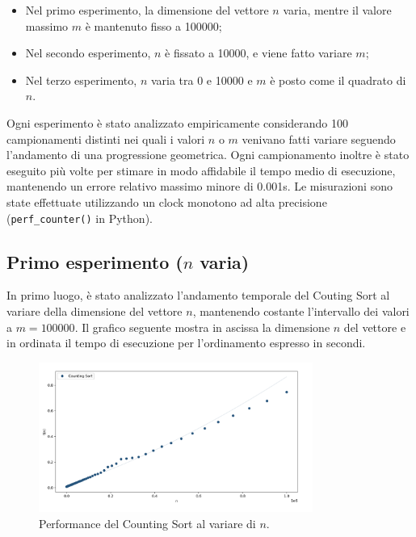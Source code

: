 \documentclass[a4paper, 12pt, oneside]{book}
\begin{document}
\begin{itemize}
    \item Nel primo esperimento, la dimensione del vettore \(n\) varia, mentre il valore massimo \(m\) è mantenuto fisso a 100000;
    \item Nel secondo esperimento, \(n\) è fissato a 10000, e viene fatto variare \(m\);
    \item Nel terzo esperimento, \(n\) varia tra 0 e 10000 e \(m\) è posto come il quadrato di \(n\).
\end{itemize}

\noindent Ogni esperimento è stato analizzato empiricamente considerando 100 campionamenti distinti nei quali i valori $n$ o $m$ venivano fatti variare seguendo l'andamento di una progressione geometrica.
Ogni campionamento inoltre è stato eseguito più volte per stimare in modo affidabile il tempo medio di esecuzione, mantenendo un errore relativo massimo minore di 0.001s.
Le misurazioni sono state effettuate utilizzando un clock monotono ad alta precisione (\texttt{perf\_counter()} in Python). \\

\subsection{Primo esperimento ($n$ varia)}

\noindent In primo luogo, è stato analizzato l'andamento temporale del Couting Sort al variare della dimensione del vettore \(n\), mantenendo costante l'intervallo dei valori a \(m = 100000\). 
Il grafico seguente mostra in ascissa la dimensione \(n\) del vettore e in ordinata il tempo di esecuzione per l'ordinamento espresso in secondi.

\begin{figure}[H]
    \centering
    \includegraphics[width=0.8\textwidth]{images/grafico_counting_sort_n.png}
    \caption{Performance del Counting Sort al variare di \(n\).}
    \label{fig:counting_sort_n}
\end{figure}
\end{document}
